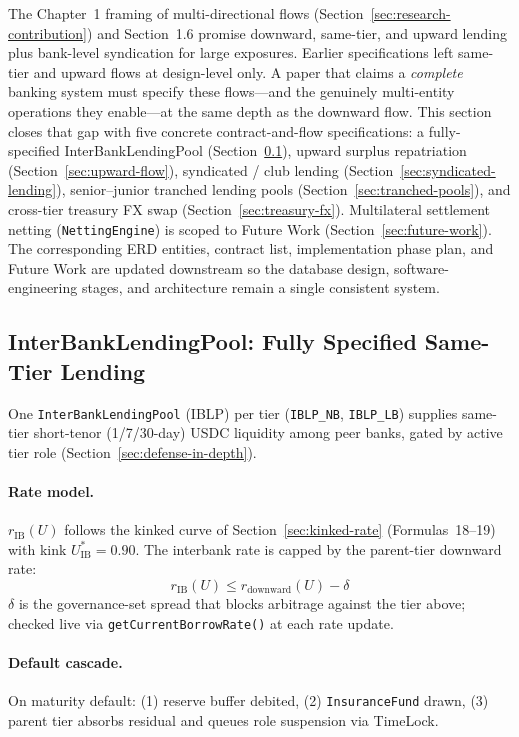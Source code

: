 \documentclass[12pt,a4paper]{report}
\begin{document}
The Chapter~1 framing of multi-directional flows (Section~\ref{sec:research-contribution}) and Section~1.6 promise downward, same-tier, and upward lending plus bank-level syndication for large exposures. Earlier specifications left same-tier and upward flows at design-level only. A paper that claims a \emph{complete} banking system must specify these flows---and the genuinely multi-entity operations they enable---at the same depth as the downward flow. This section closes that gap with five concrete contract-and-flow specifications: a fully-specified InterBankLendingPool (Section~\ref{sec:interbank-pool}), upward surplus repatriation (Section~\ref{sec:upward-flow}), syndicated / club lending (Section~\ref{sec:syndicated-lending}), senior--junior tranched lending pools (Section~\ref{sec:tranched-pools}), and cross-tier treasury FX swap (Section~\ref{sec:treasury-fx}). Multilateral settlement netting (\texttt{NettingEngine}) is scoped to Future Work (Section~\ref{sec:future-work}). The corresponding ERD entities, contract list, implementation phase plan, and Future Work are updated downstream so the database design, software-engineering stages, and architecture remain a single consistent system.

\subsection{InterBankLendingPool: Fully Specified Same-Tier Lending}
\label{sec:interbank-pool}

One \texttt{InterBankLendingPool} (IBLP) per tier (\texttt{IBLP\_NB}, \texttt{IBLP\_LB}) supplies same-tier short-tenor (1/7/30-day) USDC liquidity among peer banks, gated by active tier role (Section~\ref{sec:defense-in-depth}).

\paragraph{Rate model.}
$r_{\text{IB}}(U)$ follows the kinked curve of Section~\ref{sec:kinked-rate} (Formulas~18--19) with kink $U^{*}_{\text{IB}} = 0.90$. The interbank rate is capped by the parent-tier downward rate:
\begin{equation}
r_{\text{IB}}(U) \le r_{\text{downward}}(U) - \delta
\end{equation}
\noindent $\delta$ is the governance-set spread that blocks arbitrage against the tier above; checked live via \texttt{getCurrentBorrowRate()} at each rate update.

\paragraph{Default cascade.}
On maturity default: (1) reserve buffer debited, (2) \texttt{InsuranceFund} drawn, (3) parent tier absorbs residual and queues role suspension via TimeLock.
\end{document}
